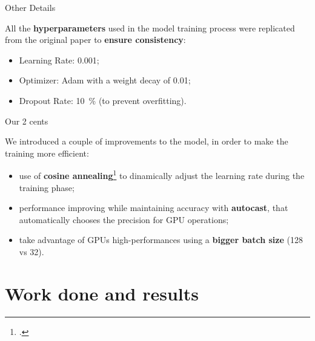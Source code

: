 	\begin{frame}{Other Details}

		All the \textbf{hyperparameters} used in the model training process were replicated from the original paper to
		\textbf{ensure consistency}:

		\begin{itemize}
			\item Learning Rate: \SI{0.001}{};
			\item Optimizer: Adam with a weight decay of \SI{0.01}{};
			\item Dropout Rate: \SI{10}{\percent} (to prevent overfitting).
		\end{itemize}

	\end{frame}

	\begin{frame}{Our 2 cents}

		We introduced a couple of improvements to the model, in order to make the training more efficient:

		\begin{itemize}
		\item {use of \textbf{cosine annealing}\footcite{DBLP:journals/corr/LoshchilovH16a} to dinamically adjust the
  		learning rate during the training phase;}
		\item {performance improving while maintaining accuracy with \textbf{autocast}, that automatically chooses
  			the precision for GPU operations;}
		\item take advantage of GPUs high-performances using a \textbf{bigger batch size} (128 vs 32).
		\end{itemize}

	\end{frame}


\section[Work done and results]{Work done and results}	

